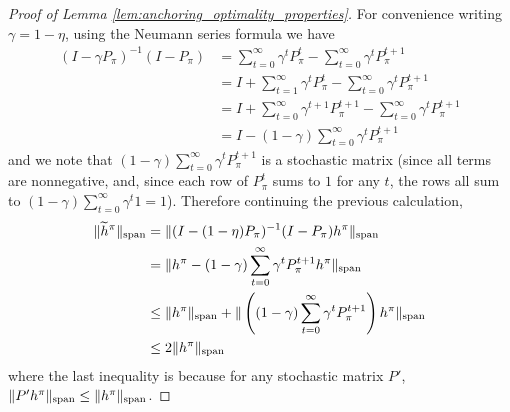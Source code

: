 \documentclass{article}
\theoremstyle{plain}
\theoremstyle{plain}
\theoremstyle{remark}
\theoremstyle{plain}
\theoremstyle{plain}
\newcommand{\htilde}{\widetilde{h}}
\begin{document}
\begin{proof}[Proof of Lemma \ref{lem:anchoring_optimality_properties}]
    For convenience writing $\gamma = 1-\eta$, using the Neumann series formula we have
    \begin{align*}
        (I - \gamma P_{\pi})^{-1}(I - P_\pi) &= \sum_{t=0}^\infty \gamma^t P_\pi^t - \sum_{t=0}^\infty \gamma^t P_\pi^{t+1} \\
        &= I + \sum_{t=1}^\infty \gamma^t P_\pi^t - \sum_{t=0}^\infty \gamma^t P_\pi^{t+1} \\
        &= I + \sum_{t=0}^\infty \gamma^{t+1} P_\pi^{t+1} - \sum_{t=0}^\infty \gamma^t P_\pi^{t+1} \\
        &= I - (1-\gamma)\sum_{t=0}^\infty \gamma^{t} P_\pi^{t+1}
    \end{align*}
    and we note that $(1-\gamma)\sum_{t=0}^\infty \gamma^{t} P_\pi^{t+1}$ is a stochastic matrix (since all terms are nonnegative, and, since each row of $P_\pi^t$ sums to $1$ for any $t$, the rows all sum to $(1-\gamma) \sum_{t=0}^\infty \gamma^t 1= 1$). Therefore continuing the previous calculation,
    \begin{align*}
        \spannorm{\htilde^\pi} &= \spannorm{(I - (1-\eta) P_{\pi})^{-1}(I - P_\pi)h^\pi} \\
        &= \spannorm{h^\pi - (1-\gamma)\sum_{t=0}^\infty \gamma^t P_\pi^{t+1} h^\pi} \\
        &\leq \spannorm{h^\pi} + \spannorm{ \left( (1-\gamma)\sum_{t=0}^\infty \gamma^t P_\pi^{t+1}\right) h^\pi} \\
        & \leq 2\spannorm{h^\pi}
    \end{align*}
    where the last inequality is because for any stochastic matrix $P'$, $\Vert P' h^\pi\Vert _{\textnormal{span}} \leq \Vert h^\pi\Vert _{\textnormal{span}}$.


\end{proof}
\end{document}
